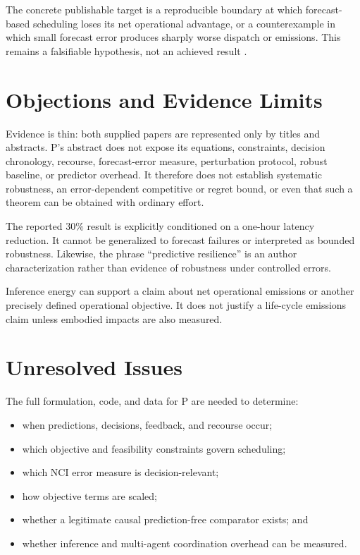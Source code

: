 \documentclass{article}
\begin{document}
The concrete publishable target is a reproducible boundary at which forecast-based scheduling loses its net operational advantage, or a counterexample in which small forecast error produces sharply worse dispatch or emissions. This remains a falsifiable hypothesis, not an achieved result .

\section{Objections and Evidence Limits}

Evidence is thin: both supplied papers are represented only by titles and abstracts. P's abstract does not expose its equations, constraints, decision chronology, recourse, forecast-error measure, perturbation protocol, robust baseline, or predictor overhead. It therefore does not establish systematic robustness, an error-dependent competitive or regret bound, or even that such a theorem can be obtained with ordinary effort.

The reported \(30\%\) result is explicitly conditioned on a one-hour latency reduction. It cannot be generalized to forecast failures or interpreted as bounded robustness. Likewise, the phrase ``predictive resilience'' is an author characterization rather than evidence of robustness under controlled errors.

Inference energy can support a claim about net operational emissions or another precisely defined operational objective. It does not justify a life-cycle emissions claim unless embodied impacts are also measured.

\section{Unresolved Issues}

The full formulation, code, and data for P are needed to determine:

\begin{itemize}
\item when predictions, decisions, feedback, and recourse occur;
\item which objective and feasibility constraints govern scheduling;
\item which NCI error measure is decision-relevant;
\item how objective terms are scaled;
\item whether a legitimate causal prediction-free comparator exists; and
\item whether inference and multi-agent coordination overhead can be measured.
\end{itemize}
\end{document}
